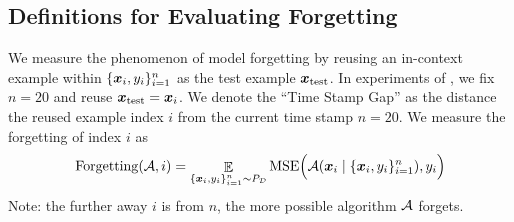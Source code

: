 \subsection{Definitions for Evaluating Forgetting} \label{ssec:forgetting}
We measure the phenomenon of model forgetting by reusing an in-context example within $\{\boldsymbol{x}_i, y_i\}_{i=1}^n$ as the test example $\boldsymbol{x}_\mathrm{test}$. In experiments of , we fix $n = 20$ and reuse $\boldsymbol{x}_\mathrm{test} = \boldsymbol{x}_i$. We denote the ``Time Stamp Gap'' as the distance the reused example index $i$ from the current time stamp $n = 20$. We measure the forgetting of index $i$ as 
\begin{equation}
   \mathrm{Forgetting}({\mathcal{A}}, i) = \mathop{\mathbb E}_{\{\boldsymbol{x}_i, y_i\}_{i=1}^n \sim P_{\mathcal{D}}} \mathrm{MSE}\Big(\mathcal A(\boldsymbol{x}_i \mid \{\boldsymbol{x}_i, y_i\}_{i=1}^n), y_i\Big)
\end{equation}
Note: the further away $i$ is from $n$, the more possible algorithm ${\mathcal{A}}$ forgets.



